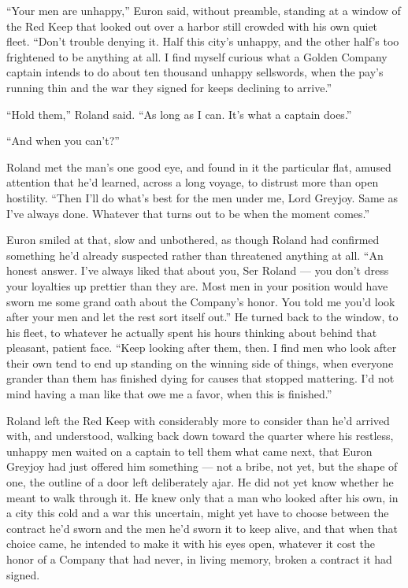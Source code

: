 “Your men are unhappy,” Euron said, without preamble, standing at a window of the Red Keep that looked out over a harbor still crowded with his own quiet fleet. “Don’t trouble denying it. Half this city’s unhappy, and the other half’s too frightened to be anything at all. I find myself curious what a Golden Company captain intends to do about ten thousand unhappy sellswords, when the pay’s running thin and the war they signed for keeps declining to arrive.”

“Hold them,” Roland said. “As long as I can. It’s what a captain does.”

“And when you can’t?”

Roland met the man’s one good eye, and found in it the particular flat, amused attention that he’d learned, across a long voyage, to distrust more than open hostility. “Then I’ll do what’s best for the men under me, Lord Greyjoy. Same as I’ve always done. Whatever that turns out to be when the moment comes.”

Euron smiled at that, slow and unbothered, as though Roland had confirmed something he’d already suspected rather than threatened anything at all. “An honest answer. I’ve always liked that about you, Ser Roland — you don’t dress your loyalties up prettier than they are. Most men in your position would have sworn me some grand oath about the Company’s honor. You told me you’d look after your men and let the rest sort itself out.” He turned back to the window, to his fleet, to whatever he actually spent his hours thinking about behind that pleasant, patient face. “Keep looking after them, then. I find men who look after their own tend to end up standing on the winning side of things, when everyone grander than them has finished dying for causes that stopped mattering. I’d not mind having a man like that owe me a favor, when this is finished.”

Roland left the Red Keep with considerably more to consider than he’d arrived with, and understood, walking back down toward the quarter where his restless, unhappy men waited on a captain to tell them what came next, that Euron Greyjoy had just offered him something — not a bribe, not yet, but the shape of one, the outline of a door left deliberately ajar. He did not yet know whether he meant to walk through it. He knew only that a man who looked after his own, in a city this cold and a war this uncertain, might yet have to choose between the contract he’d sworn and the men he’d sworn it to keep alive, and that when that choice came, he intended to make it with his eyes open, whatever it cost the honor of a Company that had never, in living memory, broken a contract it had signed.